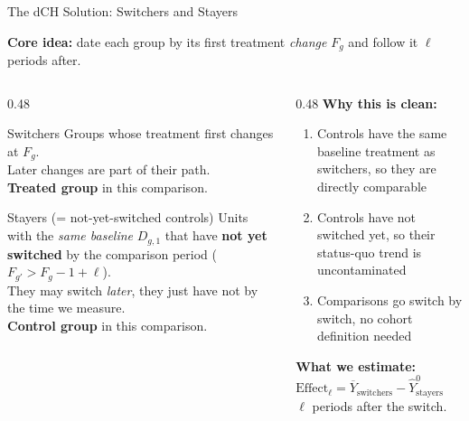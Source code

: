 \documentclass[main.tex]{subfiles}
\begin{document}
\begin{frame}{The dCH Solution: Switchers and Stayers}

  \textbf{Core idea:} date each group by its first treatment
  \emph{change} $F_g$ and follow it $\ell$ periods after.

  \bigskip
  \begin{columns}[T]
    \begin{column}{0.48\textwidth}
      \begin{block}{Switchers}
        Groups whose treatment first changes at $F_g$.\\[4pt]
        Later changes are part of their path.\\[4pt]
        \textbf{Treated group} in this comparison.
      \end{block}

      \medskip
      \begin{block}{Stayers (= not-yet-switched controls)}
        Units with the \emph{same baseline} $D_{g,1}$ that have
        \textbf{not yet switched} by the comparison period
        ($F_{g'} > F_g-1+\ell$).\\[4pt]
        They may switch \emph{later}, they just have not by the
        time we measure.\\[4pt]
        \textbf{Control group} in this comparison.
      \end{block}
    \end{column}
    \begin{column}{0.48\textwidth}
      \textbf{Why this is clean:}
      \begin{enumerate}
        \item Controls have the same baseline treatment as
          switchers, so they are directly comparable
        \item Controls have not switched yet, so their
          status-quo trend is uncontaminated
        \item Comparisons go switch by switch,
          no cohort definition needed
      \end{enumerate}

      \medskip
      \textbf{What we estimate:}\\[3pt]
      $\text{Effect}_\ell = \overline{Y}_{\text{switchers}}
        - \hat{Y}^0_{\text{stayers}}$\\[3pt]
      \footnotesize $\ell$ periods after the switch.
    \end{column}
  \end{columns}

\end{frame}
\end{document}
